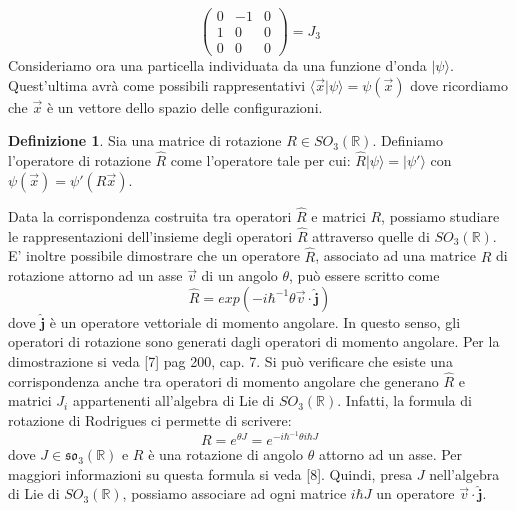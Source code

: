 \documentclass[12pt,a4paper]{report}
\theoremstyle{definition}
\newtheorem{Def}{Definizione}[chapter]
\theoremstyle{Theorem}
\theoremstyle{definition}
\theoremstyle{definition}
\theoremstyle{definition}
\begin{document}
$$
\begin{pmatrix}
	0 &-1&0\\
	1 &0&0\\
	0 &0&0
\end{pmatrix}= J_3$$
Consideriamo ora una particella individuata da una funzione d'onda $|\psi\rangle$. Quest'ultima avrà come possibili rappresentativi $\langle \vec{x}|\psi\rangle=\psi(\vec{x})$ dove ricordiamo che $\vec{x}$ è un vettore dello spazio delle configurazioni.
\begin{Def}
	Sia una matrice di rotazione $R\in SO_3(\mathbb{R})$. Definiamo l'operatore di rotazione $\hat{R}$ come l'operatore tale per cui:
	$\hat{R}|\psi\rangle=|\psi'\rangle$ con $\psi(\vec{x})=\psi'(R\vec{x})$.
\end{Def}
Data la corrispondenza costruita tra operatori $\hat{R}$ e matrici $R$, possiamo studiare le rappresentazioni dell'insieme degli operatori $\hat{R}$ attraverso quelle di $SO_3(\mathbb{R})$. E' inoltre possibile dimostrare che un operatore $\hat{R}$, associato ad una matrice $R$ di rotazione attorno ad un asse $\vec{v}$ di un angolo $\theta$, può essere scritto come 
$$\hat{R}=exp(-i\hbar^{-1}\theta\vec{v}\cdot\hat{\textbf{j}})$$
dove $\hat{\textbf{j}}$ è un operatore vettoriale di momento angolare. In questo senso, gli operatori di rotazione sono generati dagli operatori di momento angolare. Per la dimostrazione si veda [7] pag 200, cap. 7.
Si può verificare che esiste una corrispondenza anche tra operatori di momento angolare che generano $\hat{R}$ e matrici $J_i$ appartenenti all'algebra di Lie di $SO_3(\mathbb{R})$. Infatti, la formula di rotazione di Rodrigues ci permette di scrivere:
$$R=e^{\theta J}=e^{-i\hbar^{-1}\theta i\hbar J}$$
dove $J\in \mathfrak{so_3}(\mathbb{R})$ e $R$ è una rotazione di angolo $\theta$ attorno ad un asse. Per maggiori informazioni su questa formula si veda [8]. Quindi, presa $J$ nell'algebra di Lie di $SO_3(\mathbb{R})$, possiamo associare ad ogni matrice $i\hbar J$ un operatore $\vec{v}\cdot\hat{\textbf{j}}$.\\
\\  
\begin{comment}
E' noto, per il teorema delle rotazioni di Eulero, che ogni rotazione nello spazio tridimensionale lascia un asse fisso, passante per il centro di rotazione. Inoltre, vale la seguente relazione:
$$R_z(\theta)=\begin{pmatrix}
cos(\theta)&-sin(\theta)&0\\
sin(\theta)&cos(\theta)&0\\
0&0&1
\end{pmatrix}=e^{\theta J_3}$$
L'operatore associato a questa matrice è $\hat{R_z(\theta)}=exp(-i\hbar^{-1}\theta \hat{j_z})$ dove $\hat{j_z}$ è un operatore di momento angolare.
Possiamo allora generalizzare attraverso la formula di Rodrigues e scrivere, per una generica rotazione: 
\end{comment}
\end{document}
